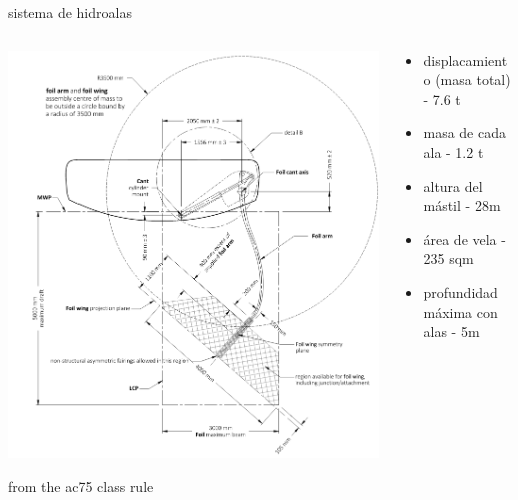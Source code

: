 \documentclass[presentation,aspectratio=169]{beamer}
\begin{document}
\begin{frame}[label={sec:org5e497de}]{sistema de hidroalas}
\begin{columns}
\begin{column}{0.5\columnwidth}
\begin{center}
\includegraphics[height=0.8\textheight]{../../figures/ac75-class-foil.png}
\end{center}

{\footnotesize from the ac75 class rule}
\end{column}
\begin{column}{0.5\columnwidth}
\begin{itemize}
\item displacamiento (masa total) - 7.6 t
\item masa de cada ala - 1.2 t
\item altura del mástil - 28m
\item área de vela - 235 sqm
\item profundidad máxima con alas - 5m
\end{itemize}
\end{column}
\end{columns}
\end{frame}
\end{document}
